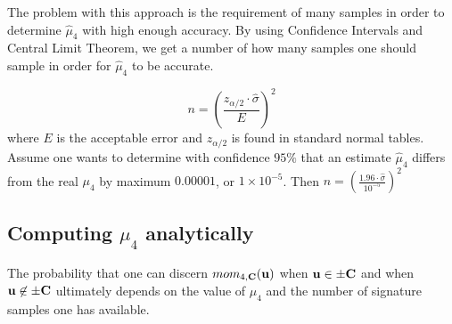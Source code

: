 The problem with this approach is the requirement of many samples in order to determine $\hat{\mu}_4$ with high enough accuracy.
By using Confidence Intervals and Central Limit Theorem, we get a number of how many samples one should sample in order for $\hat{\mu}_4$ to be accurate.

\[
    n = (\frac{z_{\alpha / 2} \cdot \hat{\sigma}}{E} )^2    
\]
where $E$ is the acceptable error and $z_{\alpha / 2}$ is found in standard normal tables.
Assume one wants to determine with confidence $95 \%$ that an estimate $\hat{\mu}_4$ differs from the real $\mu_4$ by maximum $0.00001$, or $1 \times 10^{-5}$.
Then $n = (\frac{1.96 \cdot \hat{\sigma}} {10^{-5}})^2$

\subsection{Computing $\mu_4$ analytically}
The probability that one can discern $mom_{4, \mathbf{C}}(\mathbf{u})$ when $\mathbf{u} \in \pm \mathbf{C}$ and when $\mathbf{u} \not\in \pm \mathbf{C}$ ultimately depends on the value of $\mu_4$ and the number of signature samples one has available.

